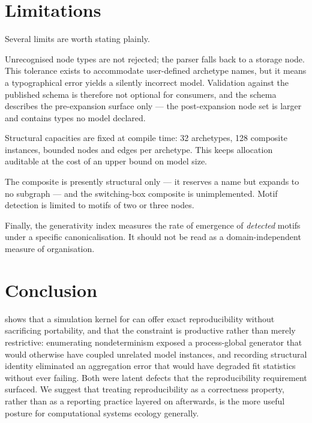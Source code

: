 \documentclass[11pt,a4paper]{article}
\begin{document}
\section{Limitations}

Several limits are worth stating plainly.

Unrecognised node types are not rejected; the parser falls back to a storage node. This tolerance exists to accommodate user-defined archetype names, but it means a typographical error yields a silently incorrect model. Validation against the published schema is therefore not optional for consumers, and the schema describes the pre-expansion surface only --- the post-expansion node set is larger and contains types no model declared.

Structural capacities are fixed at compile time: 32 archetypes, 128 composite instances, bounded nodes and edges per archetype. This keeps allocation auditable at the cost of an upper bound on model size.

The  composite is presently structural only --- it reserves a name but expands to no subgraph --- and the switching-box composite is unimplemented. Motif detection is limited to motifs of two or three nodes.

Finally, the generativity index measures the rate of emergence of \emph{detected} motifs under a specific canonicalisation. It should not be read as a domain-independent measure of organisation.

\section{Conclusion}

\gssk{} shows that a simulation kernel for \esl{} can offer exact reproducibility without sacrificing portability, and that the constraint is productive rather than merely restrictive: enumerating nondeterminism exposed a process-global generator that would otherwise have coupled unrelated model instances, and recording structural identity eliminated an aggregation error that would have degraded fit statistics without ever failing. Both were latent defects that the reproducibility requirement surfaced. We suggest that treating reproducibility as a correctness property, rather than as a reporting practice layered on afterwards, is the more useful posture for computational systems ecology generally.



\end{document}
